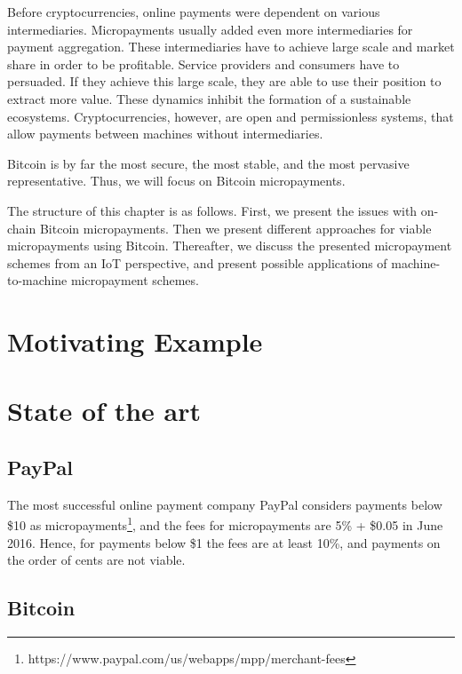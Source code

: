 Before cryptocurrencies, online payments were dependent on various intermediaries. Micropayments usually added even more intermediaries for payment aggregation. These intermediaries have to achieve large scale and market share in order to be profitable. Service providers and consumers have to persuaded. If they achieve this large scale, they are able to use their position to extract more value. These dynamics inhibit the formation of a sustainable ecosystems. Cryptocurrencies, however, are open and permissionless systems, that allow payments between machines without intermediaries.

Bitcoin is by far the most secure, the most stable, and the most pervasive representative. Thus, we will focus on Bitcoin micropayments.

The structure of this chapter is as follows. First, we present the issues with on-chain Bitcoin micropayments. Then we present different approaches for viable micropayments using Bitcoin. Thereafter, we discuss the presented micropayment schemes from an IoT perspective, and present possible applications of machine-to-machine micropayment schemes.

\section{Motivating Example}

\section{State of the art}

\subsection{PayPal}

The most successful online payment company PayPal considers payments below \$10 as micropayments\footnote{https://www.paypal.com/us/webapps/mpp/merchant-fees}, and the fees for micropayments are 5\% + \$0.05 in June 2016. Hence, for payments below \$1 the fees are at least 10\%, and payments on the order of cents are not viable.

\subsection{Bitcoin} 

